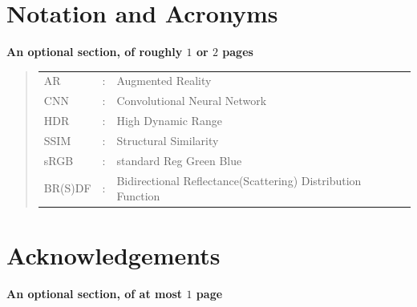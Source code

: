 \documentclass[ %
                    author={Gavin Parker},
                supervisor={Dr. Neill Campbell},
                    degree={MEng},
                     title={Deep Siamese Networks for Illumination Estimation from Stereo Images},
                  subtitle={},
                      type={research},
                      year={2018} ]{dissertation}
\begin{document}

\chapter*{Notation and Acronyms}

{\bf An optional section, of roughly $1$ or $2$ pages}
\vspace{1cm} 


\begin{quote}
\noindent
\begin{tabular}{lcl}
AR                 &:     & Augmented Reality                                         	\\
CNN                 &:     & Convolutional Neural Network                             	\\
HDR					&:		& High Dynamic Range										\\
SSIM				&:		& Structural Similarity										\\
sRGB				&:		& standard Reg Green Blue									\\
BR(S)DF				&:		& Bidirectional Reflectance(Scattering) Distribution Function
\end{tabular}
\end{quote}


\chapter*{Acknowledgements}

{\bf An optional section, of at most $1$ page}
\vspace{1cm} 

\noindent


%
\end{document}
